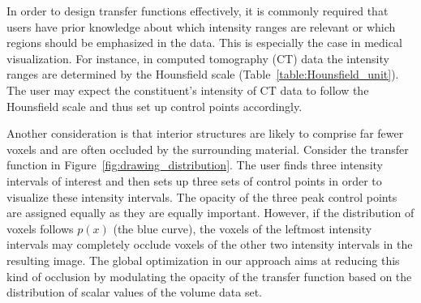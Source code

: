 In order to design transfer functions effectively, it is commonly required that users have prior knowledge about which intensity ranges are relevant or which regions should be emphasized in the data. This is especially the case in medical visualization. For instance, in computed tomography (CT) data the intensity ranges are determined by the Hounsfield scale (Table~\ref{table:Hounsfield_unit}). The user may expect the constituent's intensity of CT data to follow the Hounsfield scale and thus set up control points accordingly.

Another consideration is that interior structures are likely to comprise far fewer voxels and are often occluded by the surrounding material.
Consider the transfer function in Figure~\ref{fig:drawing_distribution}. The user finds three intensity intervals of interest and then sets up three sets of control points in order to visualize these intensity intervals. The opacity of the three peak control points are assigned equally as they are equally important.
However, if the distribution of voxels follows $ p(x) $ (the blue curve), the voxels of the leftmost intensity intervals may completely occlude voxels of the other two intensity intervals in the resulting image.
The global optimization in our approach aims at reducing this kind of occlusion by modulating the opacity of the transfer function based on the distribution of scalar values of the volume data set.

